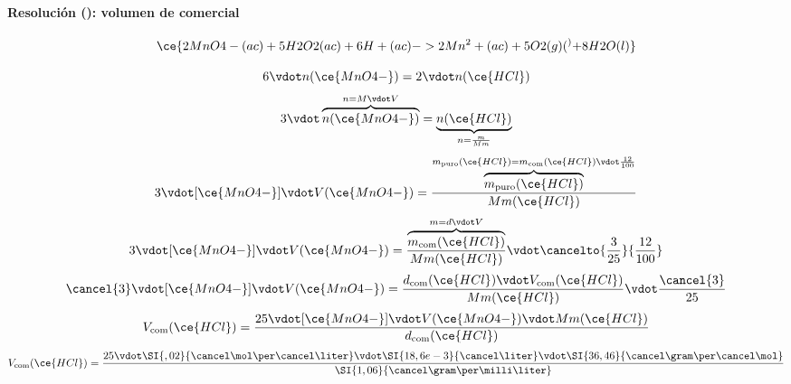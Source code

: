 \begin{frame}
    \frametitle{\ejerciciocmd}
    \framesubtitle{Resolución (): volumen de  comercial}
    $$
        \ce{2MnO4-(ac) + 5H2O2(ac) + 6H+(ac) -> 2Mn^2+(ac) + 5O2(g) (^) + 8H2O(l)}
    $$
    \begin{overprint}
            $$
                6\vdot n(\ce{MnO4-}) = 2\vdot n(\ce{HCl})
            $$
            $$
                3\vdot\overbrace{n(\ce{MnO4-})}^{n=M\vdot V} = \underbrace{ n(\ce{HCl})}_{n=\frac{m}{Mm}}
            $$
            $$
                3\vdot[\ce{MnO4-}]\vdot V(\ce{MnO4-}) = \frac{\overbrace{m_{\text{puro}}(\ce{HCl})}^{m_{\text{puro}}(\ce{HCl}) = m_{\text{com}}(\ce{HCl})\vdot\frac{12}{100}}}{Mm(\ce{HCl})}
            $$
            $$
                3\vdot[\ce{MnO4-}]\vdot V(\ce{MnO4-}) = \frac{\overbrace{m_{\text{com}}(\ce{HCl})}^{m=d\vdot V}}{Mm(\ce{HCl})}\vdot\cancelto{\frac{3}{25}}{\frac{12}{100}}
            $$
            $$
                \cancel{3}\vdot[\ce{MnO4-}]\vdot V(\ce{MnO4-}) = \frac{d_{\text{com}}(\ce{HCl})\vdot V_{\text{com}}(\ce{HCl})}{Mm(\ce{HCl})}\vdot\frac{\cancel{3}}{25}
            $$
            $$
                V_{\text{com}}(\ce{HCl}) =
                                \frac{25\vdot[\ce{MnO4-}]\vdot V(\ce{MnO4-})\vdot Mm(\ce{HCl})}{d_{\text{com}}(\ce{HCl})}
            $$
            $$
                V_{\text{com}}(\ce{HCl}) =
                    \frac{25\vdot\SI{,02}{\cancel\mol\per\cancel\liter}\vdot\SI{18,6e-3}{\cancel\liter}\vdot\SI{36,46}{\cancel\gram\per\cancel\mol}}{\SI{1,06}{\cancel\gram\per\milli\liter}}
            $$
    \end{overprint}
\end{frame}

